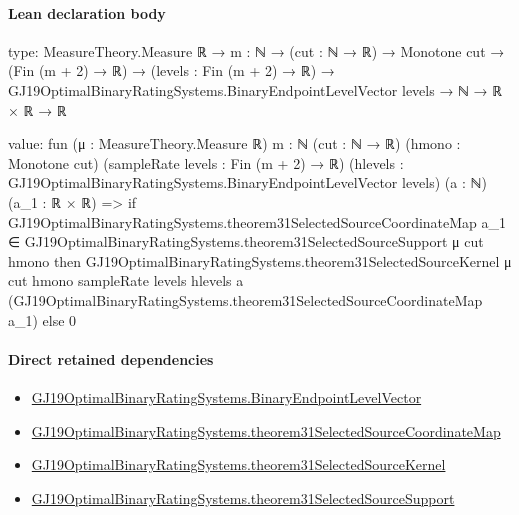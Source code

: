 \documentclass[10pt]{article}
\begin{document}
\paragraph{Lean declaration body}
\begin{ReviewVerbatim}
type:
MeasureTheory.Measure ℝ →
  {m : ℕ} →
    (cut : ℕ → ℝ) →
      Monotone cut →
        (Fin (m + 2) → ℝ) →
          (levels : Fin (m + 2) → ℝ) → GJ19OptimalBinaryRatingSystems.BinaryEndpointLevelVector levels → ℕ → ℝ × ℝ → ℝ

value:
fun (μ : MeasureTheory.Measure ℝ) {m : ℕ} (cut : ℕ → ℝ) (hmono : Monotone cut) (sampleRate levels : Fin (m + 2) → ℝ)
    (hlevels : GJ19OptimalBinaryRatingSystems.BinaryEndpointLevelVector levels) (a : ℕ) (a_1 : ℝ × ℝ) =>
  if
      GJ19OptimalBinaryRatingSystems.theorem31SelectedSourceCoordinateMap a_1 ∈
        GJ19OptimalBinaryRatingSystems.theorem31SelectedSourceSupport μ cut hmono then
    GJ19OptimalBinaryRatingSystems.theorem31SelectedSourceKernel μ cut hmono sampleRate levels hlevels a
      (GJ19OptimalBinaryRatingSystems.theorem31SelectedSourceCoordinateMap a_1)
  else 0
\end{ReviewVerbatim}

\paragraph{Direct retained dependencies}
\begin{itemize}\raggedright
\item \hyperlink{governing-declaration-aa797f827cdcda67}{GJ19\allowbreak{}Optimal\allowbreak{}Binary\allowbreak{}Rating\allowbreak{}Systems.\allowbreak{}Binary\allowbreak{}Endpoint\allowbreak{}Level\allowbreak{}Vector}
\item \hyperlink{governing-declaration-8b099024dcacbc69}{GJ19\allowbreak{}Optimal\allowbreak{}Binary\allowbreak{}Rating\allowbreak{}Systems.\allowbreak{}theorem31\allowbreak{}Selected\allowbreak{}Source\allowbreak{}Coordinate\allowbreak{}Map}
\item \hyperlink{governing-declaration-003605c5c1619457}{GJ19\allowbreak{}Optimal\allowbreak{}Binary\allowbreak{}Rating\allowbreak{}Systems.\allowbreak{}theorem31\allowbreak{}Selected\allowbreak{}Source\allowbreak{}Kernel}
\item \hyperlink{governing-declaration-bc1f956025e714e1}{GJ19\allowbreak{}Optimal\allowbreak{}Binary\allowbreak{}Rating\allowbreak{}Systems.\allowbreak{}theorem31\allowbreak{}Selected\allowbreak{}Source\allowbreak{}Support}
\end{itemize}
\hypertarget{governing-declaration-1ec8e3a7f5b9825c}{}
\end{document}
